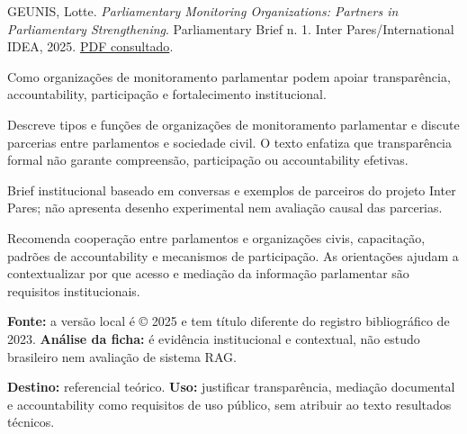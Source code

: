 {\small GEUNIS, Lotte. \textit{Parliamentary Monitoring Organizations: Partners in Parliamentary Strengthening}. Parliamentary Brief n. 1. Inter Pares/International IDEA, 2025. \href{https://www.inter-pares.eu/sites/default/files/2025-12/parliamentary-monitoring-organizations.pdf}{PDF consultado}.\par}

Como organizações de monitoramento parlamentar podem apoiar transparência, accountability, participação e fortalecimento institucional.

Descreve tipos e funções de organizações de monitoramento parlamentar e discute parcerias entre parlamentos e sociedade civil. O texto enfatiza que transparência formal não garante compreensão, participação ou accountability efetivas.

Brief institucional baseado em conversas e exemplos de parceiros do projeto Inter Pares; não apresenta desenho experimental nem avaliação causal das parcerias.

Recomenda cooperação entre parlamentos e organizações civis, capacitação, padrões de accountability e mecanismos de participação. As orientações ajudam a contextualizar por que acesso e mediação da informação parlamentar são requisitos institucionais.

\begin{itemize}
\end{itemize}

\textbf{Fonte:} a versão local é © 2025 e tem título diferente do registro bibliográfico de 2023. \textbf{Análise da ficha:} é evidência institucional e contextual, não estudo brasileiro nem avaliação de sistema RAG.

\textbf{Destino:} referencial teórico. \textbf{Uso:} justificar transparência, mediação documental e accountability como requisitos de uso público, sem atribuir ao texto resultados técnicos.

